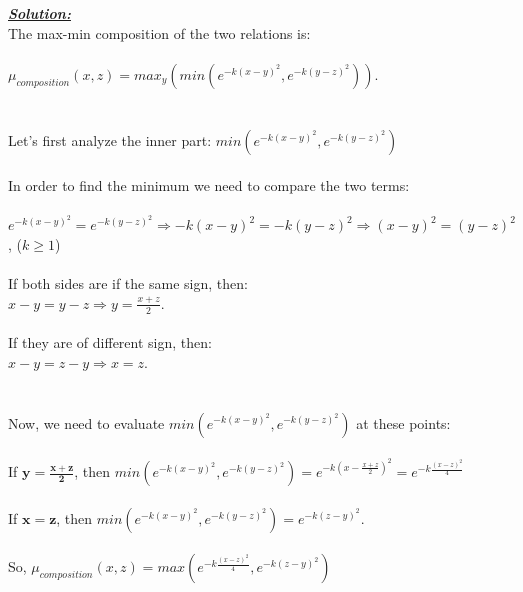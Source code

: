 \documentclass{article}
\begin{document}
\vspace{1cm}
\noindent \underline{\textbf{\textit{Solution:}}}\\
\noindent The max-min composition of the two relations is: \\ \\
$\mu_{composition}(x,z) = max_y(min(e^{-k(x-y)^2}, e^{-k(y-z)^2}))$. \\ \\ \\Let's first analyze the inner part: $min(e^{-k(x-y)^2}, e^{-k(y-z)^2})$ \\ \\
In order to find the minimum we need to compare the two terms: \\ \\
$e^{-k(x-y)^2} = e^{-k(y-z)^2} \Rightarrow -k(x-y)^2 = -k(y-z)^2 \Rightarrow (x-y)^2 = (y-z)^2$, ($k \geq 1$) \\ \\
If both sides are if the same sign, then: \\ $x-y = y-z \Rightarrow y = \frac{x+z}{2}$.\\\\
If they are of different sign, then: \\ $x-y = z-y \Rightarrow x = z$.\\\\\\Now, we need to evaluate $min(e^{-k(x-y)^2}, e^{-k(y-z)^2})$ at these points: \\ \\
If $\bm{y = \frac{x+z}{2}}$, then $min(e^{-k(x-y)^2}, e^{-k(y-z)^2}) = e^{-k(x-\frac{x+z}{2})^2} = e^{-k\frac{(x-z)^2}{4}}$ \\ \\
If $\bm{x=z}$, then  $min(e^{-k(x-y)^2}, e^{-k(y-z)^2}) = e^{-k(z-y)^2}$. \\\\ So, $\mu_{composition}(x,z) = max(e^{-k\frac{(x-z)^2}{4}},  e^{-k(z-y)^2})$
\end{document}
